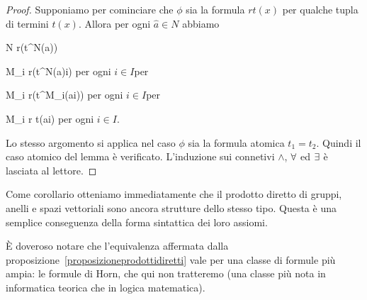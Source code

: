 \begin{proof}
Supponiamo per cominciare che $\phi$ sia la formula $rt(x)$ per qualche tupla di termini $t(x)$. Allora per ogni $\hat a\in N$ abbiamo

%
{\IFF}%
{N\phantom{_i}\models\; r\big(t^N(\hat a)\big)}

\ceq{}{\IFF}%
{M_i\models\; r\big(t^N(\hat a)i\big)}
per ogni $i\in I$\hfill per 

\ceq{}{\IFF}%
{M_i\models\; r\big(t^{M_i}(\hat ai)\big)}
per ogni $i\in I$\hfill per 

\ceq{}{\IFF}%
{M_i\models\;  r t(\hat ai)}
per ogni $i\in I$.

% 
% 
% 

Lo stesso argomento si applica nel caso $\phi$ sia la formula atomica $t_1=t_2$. Quindi il caso atomico del lemma \`e verificato. L'induzione sui connetivi $\wedge$, $\forall$ ed $\exists$ \`e lasciata al lettore.
\end{proof}

Come corollario otteniamo immediatamente che il prodotto diretto di gruppi, anelli e spazi vettoriali sono ancora strutture dello stesso tipo. Questa \`e una semplice conseguenza della forma sintattica dei loro assiomi.

\`E doveroso notare che l'equivalenza affermata dalla proposizione~\ref{proposizioneprodottidiretti} vale per una classe di formule pi\`u ampia: le formule di Horn, che qui non tratteremo (una classe pi\`u nota in informatica teorica che in logica matematica).

